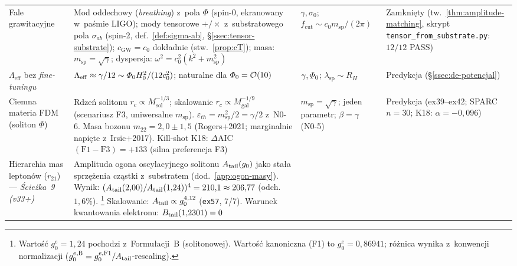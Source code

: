 \begin{center}
\begin{tabular}{@{}>{\raggedright}p{2.5cm}p{5.5cm}p{2.2cm}p{2.5cm}@{}}
Fale grawitacyjne
  & Mod oddechowy (\emph{breathing}) z~pola $\Phi$ (spin-0,
    ekranowany w~pa\'smie LIGO); mody tensorowe $+/\times$
    z~substratowego pola $\sigma_{ab}$ (spin-2,
    def.~\ref{def:sigma-ab}, \S\ref{ssec:tensor-substrate});
    $c_{\mathrm{GW}} = c_0$ dok\l{}adnie (stw.~\ref{prop:cT});
    masa: $m_{\mathrm{sp}} = \sqrt{\gamma}$;
    dyspersja: $\omega^2 = c_0^2(k^2 + m_{\mathrm{sp}}^2)$
  & $\gamma, \sigma_0$;\newline $f_{\mathrm{cut}} \sim c_0 m_{\mathrm{sp}}/(2\pi)$
  & Zamkni\k{e}ty (tw.~\ref{thm:amplitude-matching}, skrypt \texttt{tensor\_from\_substrate.py}: $12/12$ PASS) \\[4pt]
$\Lambda_{\mathrm{eff}}$ bez \emph{fine-tuningu}
  & $\Lambda_{\mathrm{eff}} \approx \gamma/12
    \sim \varPhi_0 H_0^2/(12 c_0^2)$;
    naturalne dla $\varPhi_0 = \mathcal{O}(10)$
  & $\gamma, \varPhi_0$;\newline
    $\lambda_{\mathrm{sp}} \sim R_H$
  & Predykcja (\S\ref{ssec:de-potencjal}) \\[4pt]
Ciemna materia FDM (soliton $\Phi$)
  & Rdze\'n solitonu $r_c \propto M_{\mathrm{sol}}^{-1/3}$;
    skalowanie $r_c \propto M_{\mathrm{gal}}^{-1/9}$
    (scenariusz F3, uniwersalne $m_{\mathrm{sp}}$).
    $\varepsilon_{th} = m_{\mathrm{sp}}^2/2 = \gamma/2$ z~N0-6.
    Masa bozonu $m_{22} = 2{,}0 \pm 1{,}5$
    (Rogers+2021; marginalnie napi\k{e}te z~Irsic+2017).
    Kill-shot K18: $\Delta$AIC$(\mathrm{F1-F3}) = +133$
    (silna preferencja F3)
  & $m_{\mathrm{sp}} = \sqrt{\gamma}$;\newline
    jeden parametr;\newline
    $\beta = \gamma$ (N0-5)
  & Predykcja (ex39--ex42;\newline
    SPARC $n=30$;\newline
    K18: $\alpha=-0{,}096$) \\[4pt]
Hierarchia mas lepton\'ow ($r_{21}$) --- \emph{\'Scie\.zka~9 (v33+)}
  & Amplituda ogona oscylacyjnego solitonu $A_{\rm tail}(g_0)$ jako
    sta\l{}a sprz\k{e}\.zenia cz\k{a}stki z~substratem
    (dod.~\ref{app:ogon-masy}).
    Wynik: $(A_{\rm tail}(2{,}00)/A_{\rm tail}(1{,}24))^4
    = 210{,}1 \approx 206{,}77$
    (odch.\ $1{,}6\%$).%
    \footnote{Warto\'s\'c $g_0^e = 1{,}24$ pochodzi z~Formu\l{}acji~B
    (solitonowej). Warto\'s\'c kanoniczna (F1) to $g_0^e = 0{,}86941$;
    r\'o\.znica wynika z~konwencji normalizacji
    ($g_0^{e,\mathrm{B}} = g_0^{e,\mathrm{F1}} / A_{\rm tail}$-rescaling).}
    Skalowanie: $A_{\rm tail} \propto g_0^{4{,}12}$ (\texttt{ex57}, 7/7).
    Warunek kwantowania elektronu: $B_{\rm tail}(1{,}2301) = 0$

\end{tabular}
\end{center}
